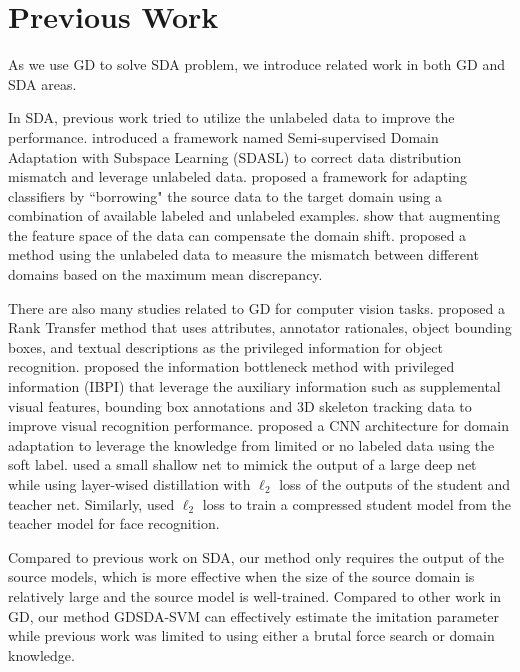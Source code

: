 \section{Previous Work}\label{sec:aaai:work}
As we use GD to solve SDA problem, we introduce related work in both GD and SDA areas.

In SDA, previous work tried to utilize the unlabeled data to improve the performance.  \cite{yao2015semi} introduced a framework named Semi-supervised Domain Adaptation with Subspace Learning (SDASL) to correct data distribution mismatch and leverage unlabeled data. \cite{Donahue_2013_CVPR} proposed a framework for adapting classifiers by ``borrowing" the source data to the target domain using a combination of available labeled and unlabeled examples. \cite{daume2010frustratingly} show that augmenting the feature space of the data can compensate the domain shift.
\cite{duan2009domain} proposed a method using the unlabeled data to measure the mismatch between different domains based on the maximum mean discrepancy. %

There are also many studies related to GD for computer vision tasks. \cite{Sharmanska_2013_ICCV} proposed a Rank Transfer method that uses attributes, annotator
rationales, object bounding boxes, and textual descriptions as the privileged information for object recognition. \cite{Motiian_2016_CVPR} proposed {the information bottleneck method with privileged information (IBPI)} that leverage the auxiliary information such as supplemental visual features, bounding box annotations and 3D skeleton tracking data to improve visual recognition performance. \cite{Tzeng_2015_ICCV} proposed a CNN architecture for domain adaptation to leverage the knowledge from limited or no labeled data using the soft label. \cite{urban2016deep} used a small shallow net to mimick the output of a large deep net while using layer-wised distillation with $\ell_2$ loss of the outputs of the student and teacher net. Similarly, \cite{luo2016face} used $\ell_2$ loss to train a compressed student model from the teacher model for face recognition. 

Compared to previous work on SDA, our method only requires the output of the source models, which is more effective when the size of the source domain is relatively large and the source model is well-trained. Compared to other work in GD, our method GDSDA-SVM can effectively estimate the imitation parameter while previous work was limited to using either a brutal force search or domain knowledge.

